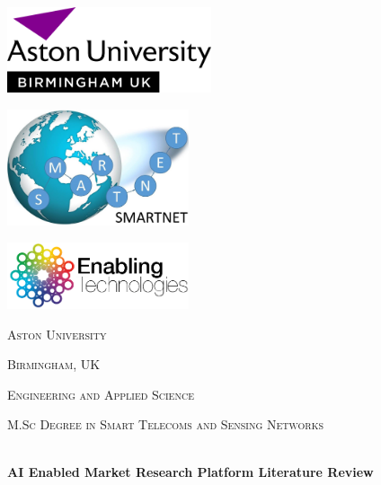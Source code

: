 \begin{titlepage}
	\centering
	\includegraphics[width=0.45\textwidth]{img/aston.png}\par\vspace{0.5cm}
	\includegraphics[width=0.4\textwidth]{img/smartnet.png}\par\vspace{0.5cm}
	\includegraphics[width=0.4\textwidth]{img/eticc.png}\par\vspace{0.5cm}
	{\scshape\LARGE Aston University \par}
	\vspace{0.2cm}
	{\scshape\Large Birmingham, UK \par}
	\vspace{0.2cm}
	{\scshape\Large Engineering and Applied Science \par}
	\vspace{0.2cm}
	{\scshape\Large M.Sc Degree in Smart Telecoms and Sensing Networks \par}
	\vspace{0.2cm}
	\HRule \\[0.4cm]
	{ \huge \bfseries AI Enabled Market Research Platform \newline \newline Literature Review}\\[0.2cm] 
	\HRule \\[1cm]


\end{titlepage}
